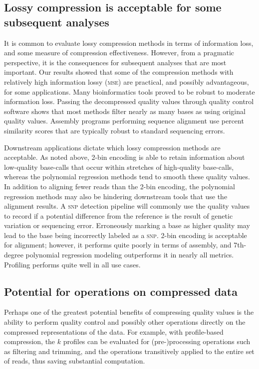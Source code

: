 \documentclass{bioinfo}
\begin{document}
\subsection{Lossy compression is acceptable for some subsequent  
analyses}

It is common to evaluate lossy compression methods in terms of
information loss, and some measure of compression effectiveness.
However, from a pragmatic perspective, it is the consequences for
subsequent analyses that are most important. Our results showed that
some of the compression methods with relatively high information lossy
(\textsc{mse}) are practical, and possibly advantageous, for some
applications. Many bioinformatics tools proved to be robust to
moderate information loss. Passing the decompressed quality values
through quality control software shows that most methods filter nearly
as many bases as using original quality values. Assembly programs
performing sequence alignment use percent similarity scores that are
typically robust to standard sequencing errors.

Downstream applications dictate which lossy compression methods are
acceptable. As noted above, 2-bin encoding is able to retain
information about low-quality base-calls that occur within stretches
of high-quality base-calls, whereas the polynomial regression methods
tend to smooth these quality values. In addition to aligning fewer
reads than the 2-bin encoding, the polynomial regression methods may
also be hindering downstream tools that use the alignment results. A
\textsc{snp} detection pipeline will commonly use the quality values
to record if a potential difference from the reference is the result
of genetic variation or sequencing error. Erroneously marking a base
as higher quality may lead to the base being incorrectly labeled as a
\textsc{snp}. 2-bin encoding is acceptable for alignment; however, it
performs quite poorly in terms of assembly, and 7th-degree polynomial
regression modeling outperforms it in nearly all metrics. Profiling
performs quite well in all use cases.

\subsection{Potential for operations on compressed data}

Perhaps one of the greatest potential benefits of compressing quality
values is the ability to perform quality control and possibly other
operations directly on the compressed representations of the data. For
example, with profile-based compression, the $k$ profiles can be
evaluated for (pre-)processing operations such as filtering and
trimming, and the operations transitively applied to the entire set of
reads, thus saving substantial computation.
\end{document}
